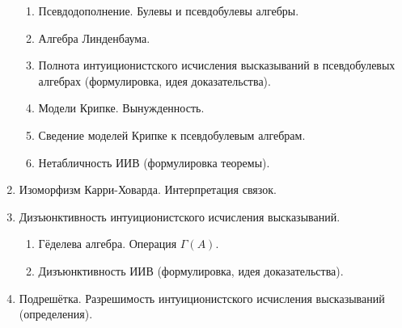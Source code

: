 \documentclass[11pt,a4paper,oneside]{scrartcl}
\begin{document}
\begin{enumerate}
\begin{enumerate}
\item Псевдодополнение. Булевы и псевдобулевы алгебры.
\item Алгебра Линденбаума. 
\item Полнота интуиционистского исчисления высказываний в псевдобулевых алгебрах (формулировка, идея доказательства).
\item Модели Крипке. Вынужденность.
\item Сведение моделей Крипке к псевдобулевым алгебрам. 
\item Нетабличность ИИВ (формулировка теоремы).
\end{enumerate}
\item Изоморфизм Карри-Ховарда. Интерпретация связок.
\item Дизъюнктивность интуиционистского исчисления высказываний.
\begin{enumerate}
\item Гёделева алгебра. Операция $\Gamma(A)$.
\item Дизъюнктивность ИИВ (формулировка, идея доказательства).
\end{enumerate}
\item Подрешётка. Разрешимость интуиционистского исчисления высказываний (определения).

\end{enumerate}
\end{document}

